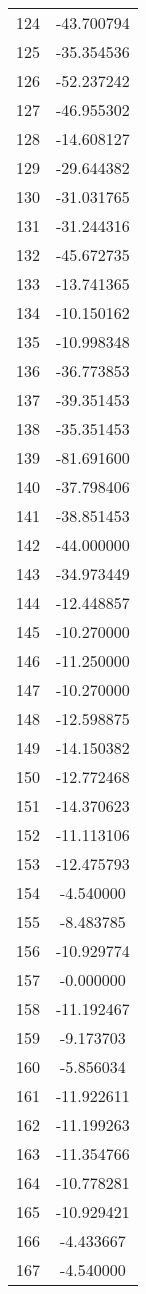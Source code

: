 \documentclass[12pt]{article}
\begin{document}
\begin{longtable}{@{}cc@{}}
124 & -43.700794 \\
125 & -35.354536 \\
126 & -52.237242 \\
127 & -46.955302 \\
128 & -14.608127 \\
129 & -29.644382 \\
130 & -31.031765 \\
131 & -31.244316 \\
132 & -45.672735 \\
133 & -13.741365 \\
134 & -10.150162 \\
135 & -10.998348 \\
136 & -36.773853 \\
137 & -39.351453 \\
138 & -35.351453 \\
139 & -81.691600 \\
140 & -37.798406 \\
141 & -38.851453 \\
142 & -44.000000 \\
143 & -34.973449 \\
144 & -12.448857 \\
145 & -10.270000 \\
146 & -11.250000 \\
147 & -10.270000 \\
148 & -12.598875 \\
149 & -14.150382 \\
150 & -12.772468 \\
151 & -14.370623 \\
152 & -11.113106 \\
153 & -12.475793 \\
154 & -4.540000 \\
155 & -8.483785 \\
156 & -10.929774 \\
157 & -0.000000 \\
158 & -11.192467 \\
159 & -9.173703 \\
160 & -5.856034 \\
161 & -11.922611 \\
162 & -11.199263 \\
163 & -11.354766 \\
164 & -10.778281 \\
165 & -10.929421 \\
166 & -4.433667 \\
167 & -4.540000 \\

\end{longtable}
\end{document}
